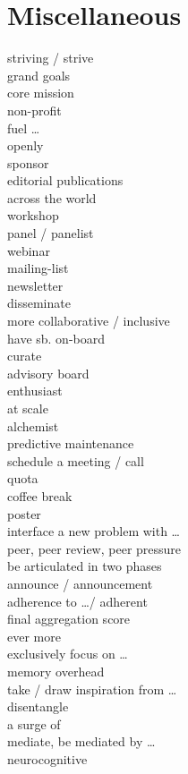 \documentclass[12pt]{article}
\begin{document}
\section{Miscellaneous}
striving / strive \\
grand goals \\
core mission \\
non-profit \\
fuel \dots \\
openly \\
sponsor \\
editorial publications \\
across the world \\
workshop \\
panel / panelist \\
webinar \\
mailing-list \\
newsletter \\
disseminate \\
more collaborative / inclusive \\
have sb. on-board \\
curate \\
advisory board \\
enthusiast \\
at scale \\
alchemist \\
predictive maintenance \\
schedule a meeting / call \\
quota \\
coffee break \\
poster \\
interface a new problem with \dots \\
peer, peer review, peer pressure \\
be articulated in two phases \\
announce / announcement \\
adherence to \dots / adherent \\
final aggregation score \\
ever more \\
exclusively focus on \dots \\
memory overhead \\
take / draw inspiration from \dots \\
disentangle \\
a surge of \\
mediate, be mediated by \dots \\
neurocognitive \\
\end{document}
